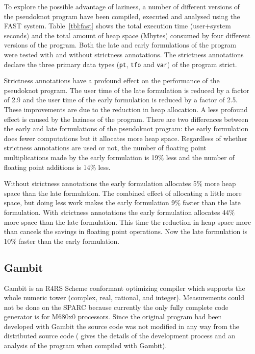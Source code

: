 To explore the possible advantage of laziness, a number of different
versions of the pseudoknot program have been compiled, executed and
analysed using the FAST system. Table~\ref{tbl:fast} shows the total
execution time (user+system seconds) and the total amount of heap
space (Mbytes) consumed by four different versions of the
program. Both the late and early formulations of the program were
tested with and without strictness annotations.  The strictness
annotations declare the three primary data types (\verb=pt=,
\verb=tfo= and \verb=var=) of the program strict.

Strictness annotations have a profound effect on the performance of the
pseudoknot program. The user time of the late formulation is reduced by a
factor of 2.9 and the user time of the early formulation is reduced by a
factor of 2.5. These improvements are due to the reduction in heap
allocation.
A less profound effect is caused by the laziness of the program.
There are two differences between the early and late formulations of the
pseudoknot program: the early formulation does fewer computations but it
allocates more heap space.
Regardless of whether strictness annotations are used or not, the
number of floating point multiplications made by the early formulation is
19\% less and the number of floating point additions is 14\% less.

Without strictness annotations the early formulation allocates 5\% more heap
space than the late formulation. The combined effect of allocating a
little more space, but doing less work makes the early formulation 9\%
faster than the late formulation.
With strictness annotations the early formulation allocates 44\% more space
than the late formulation. This time the reduction in heap space more than
cancels the savings in floating point operations. Now the late formulation
is 10\% faster than the early formulation.

\subsection{Gambit}
Gambit is an R4RS Scheme conformant optimizing compiler which supports
the whole numeric tower (complex, real, rational, and integer).
Measurements could not be done on the SPARC because currently the only
fully complete code generator is for M680x0 processors.  Since the
original program had been developed with Gambit the source code was
not modified in any way from the distributed source code (\cite{Fee94}
gives the details of the development process and an analysis of the
program when compiled with Gambit).

